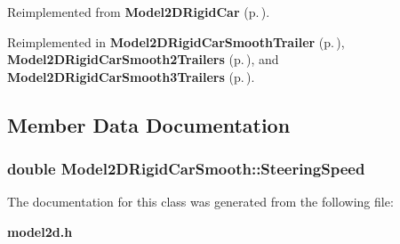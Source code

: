 Reimplemented from {\bf Model2DRigid\-Car} {\rm (p.\,\pageref{class_Model2DRigidCar_a2})}.

Reimplemented in {\bf Model2DRigid\-Car\-Smooth\-Trailer} {\rm (p.\,\pageref{class_Model2DRigidCarSmoothTrailer_a2})}, {\bf Model2DRigid\-Car\-Smooth2Trailers} {\rm (p.\,\pageref{class_Model2DRigidCarSmooth2Trailers_a2})}, and {\bf Model2DRigid\-Car\-Smooth3Trailers} {\rm (p.\,\pageref{class_Model2DRigidCarSmooth3Trailers_a2})}.

\subsection{Member Data Documentation}
\subsubsection{\setlength{\rightskip}{0pt plus 5cm}double Model2DRigid\-Car\-Smooth::Steering\-Speed}\label{class_Model2DRigidCarSmooth_m0}




The documentation for this class was generated from the following file:\begin{CompactItemize}
\item 
{\bf model2d.h}\end{CompactItemize}
